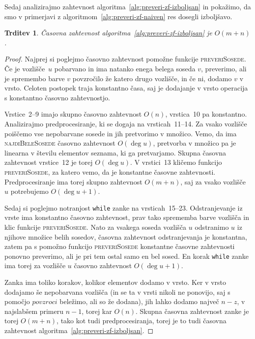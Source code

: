 \documentclass[12pt,a4paper,twoside]{article}
\theoremstyle{definition} %
\theoremstyle{plain} %
\newtheorem{trditev}[definicija]{Trditev}
\numberwithin{equation}{section}  %
\begin{document}
Sedaj analizirajmo zahtevnost algoritma~\ref{alg:preveri-zf-izboljsan} in pokažimo, da smo v primerjavi z algoritmom~\ref{alg:preveri-zf-naiven} res dosegli izboljšavo.
\begin{trditev}
    Časovna zahtevnost algoritma~\ref{alg:preveri-zf-izboljsan} je $O(m+n)$.
\end{trditev}
\begin{proof}
    Najprej si poglejmo časovno zahtevnost pomožne funkcije \textsc{preveriSosede}. Če je vozlišče~$u$ pobarvano in ima natanko enega belega soseda $v$, preverimo, ali je spremembo barve $v$ povzročilo že katero drugo vozlišče, in če ni, dodamo $v$ v vrsto. Celoten postopek traja konstantno časa, saj je dodajanje v vrsto operacija s konstantno časovno zahtevnostjo.

    Vrstice~2--9 imajo skupno časovno zahtevnost $O(n)$, vrstica~10 pa konstantno. Analizirajmo predprocesiranje, ki se dogaja na vrsticah~11--14. Za vsako vozlišče poiščemo vse nepobarvane sosede in jih pretvorimo v množico. Vemo, da ima \textsc{najdiBeleSosede} časovno zahtevnost $O(\deg u)$, pretvorba v množico pa je linearna v številu elementov seznama, ki ga pretvarjamo. Skupna časovna zahtevnost vrstice~12 je torej $O(\deg u)$. V vrstici~13 kličemo funkcijo \textsc{preveriSosede}, za katero vemo, da je konstantne časovne zahtevnosti.
    Predprocesiranje ima torej skupno zahtevnost $O(m+n)$, saj za vsako vozlišče~$u$ potrebujemo $O(\deg u + 1)$.

    Sedaj si poglejmo notranjost \texttt{while} zanke na vrsticah~15--23. Odstranjevanje iz vrste ima konstantno časovno zahtevnost, prav tako sprememba barve vozlišča in klic funkcije \textsc{preveriSosede}. Nato za vsakega soseda vozlišča $u$ odstranimo $u$ iz njihove množice belih sosedov, časovna zahtevnost odstranjevanja je konstantna, zatem pa s pomožno funkcijo \textsc{preveriSosede} konstantne časovne zahtevnosti ponovno preverimo, ali je pri tem ostal samo en bel sosed. En korak \texttt{while} zanke ima torej za vozlišče $u$ časovno zahtevnost $O(\deg u + 1)$.

    Zanka ima toliko korakov, kolikor elementov dodamo v vrsto. Ker v vrsto dodajamo še nepobarvana vozlišča (in se ta v vrsti nikoli ne ponovijo, saj s pomočjo $povzroci$ beležimo, ali so že dodana), jih lahko dodamo največ $n-z$, v najslabšem primeru $n-1$, torej kar $O(n)$. Skupna časovna zahtevnost zanke je torej $O(m+n)$, tako kot tudi predprocesiranja, torej je to tudi časovna zahtevnost algoritma~\ref{alg:preveri-zf-izboljsan}.
\end{proof}
\end{document}
